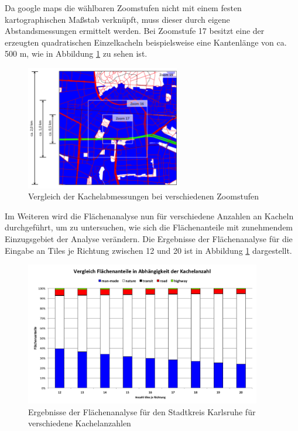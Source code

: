 \documentclass[12pt,a4paper]{scrartcl}
\begin{document}
%
Da google maps die wählbaren Zoomstufen nicht mit einem festen kartographischen Maßstab verknüpft, muss dieser durch eigene Abstandsmessungen ermittelt werden. Bei Zoomstufe 17 besitzt eine der erzeugten quadratischen Einzelkacheln beispielsweise eine Kantenlänge von ca. \num{500} \si{\metre}, wie in Abbildung \ref{fig:Zoomvgl} zu sehen ist.\\
%
\begin{figure}
  \centering
    \includegraphics[width=0.6\textwidth]{images/3_Zoomvergleich_KA.png}
    \caption{Vergleich der Kachelabmessungen bei verschiedenen Zoomstufen}
    \label{fig:Zoomvgl}
\end{figure}
%
Im Weiteren wird die Flächenanalyse nun für verschiedene Anzahlen an Kacheln durchgeführt, um zu untersuchen, wie sich die Flächenanteile mit zunehmendem Einzugsgebiet der Analyse verändern. Die Ergebnisse der Flächenanalyse für die Eingabe an Tiles je Richtung zwischen 12 und 20 ist in Abbildung \ref{fig:Zoomvgl} dargestellt.\\
%
\newline
\begin{figure}
  \centering
    \includegraphics[width=0.92\textwidth]{images/3_Kachelvergleich_KA.png}
    \caption{Ergebnisse der Flächenanalyse für den Stadtkreis Karlsruhe für verschiedene Kachelanzahlen}
    \label{fig:Kachel_vgl}
\end{figure}
\end{document}
